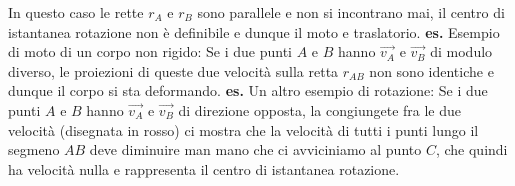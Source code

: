 In questo caso le rette $r_A$ e $r_B$ sono parallele e non si incontrano mai, il centro di istantanea rotazione non è definibile e dunque il moto e traslatorio.\newline
\textbf{es.} Esempio di moto di un corpo non rigido:\newline
Se i due punti $A$ e $B$ hanno $\vec{v_A}$ e $\vec{v_B}$ di modulo diverso, le proiezioni di queste due velocità sulla retta $r_{AB}$ non sono identiche e dunque il corpo si sta deformando.\newline
\textbf{es.} Un altro esempio di rotazione:\newline
Se i due punti $A$ e $B$ hanno $\vec{v_A}$ e $\vec{v_B}$ di direzione opposta, la congiungete fra le due velocità (disegnata in rosso) ci mostra che la velocità di tutti i punti lungo il segmeno $AB$ deve diminuire man mano che ci avviciniamo al punto $C$, che quindi ha velocità nulla e rappresenta il centro di istantanea rotazione.